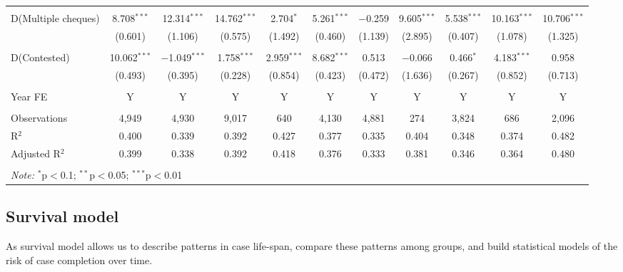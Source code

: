 \begin{landscape}
\begin{table}
{\begin{tabular}{lcccccccccc}
 & & & & & & & & & & \\ 
 D(Multiple cheques) & 8.708$^{***}$ & 12.314$^{***}$ & 14.762$^{***}$ & 2.704$^{*}$ & 5.261$^{***}$ & $-$0.259 & 9.605$^{***}$ & 5.538$^{***}$ & 10.163$^{***}$ & 10.706$^{***}$ \\ 
 & (0.601) & (1.106) & (0.575) & (1.492) & (0.460) & (1.139) & (2.895) & (0.407) & (1.078) & (1.325) \\ 
 & & & & & & & & & & \\ 
 D(Contested) & 10.062$^{***}$ & $-$1.049$^{***}$ & 1.758$^{***}$ & 2.959$^{***}$ & 8.682$^{***}$ & 0.513 & $-$0.066 & 0.466$^{*}$ & 4.183$^{***}$ & 0.958 \\ 
 & (0.493) & (0.395) & (0.228) & (0.854) & (0.423) & (0.472) & (1.636) & (0.267) & (0.852) & (0.713) \\ 
 \hline \\[-1.8ex]
 Year FE & Y & Y & Y & Y & Y & Y & Y & Y & Y & Y \\
 \hline \\[-1.8ex] 
 Observations & 4,949 & 4,930 & 9,017 & 640 & 4,130 & 4,881 & 274 & 3,824 & 686 & 2,096 \\ 
 R$^{2}$ & 0.400 & 0.339 & 0.392 & 0.427 & 0.377 & 0.335 & 0.404 & 0.348 & 0.374 & 0.482 \\ 
 Adjusted R$^{2}$ & 0.399 & 0.338 & 0.392 & 0.418 & 0.376 & 0.333 & 0.381 & 0.346 & 0.364 & 0.480 \\ 
 \hline \\[-1.8ex] 
 \multicolumn{11}{l}{\textit{Note:} $^{*}$p$<$0.1; $^{**}$p$<$0.05; $^{***}$p$<$0.01} \\ 
 \end{tabular} }
 \end{table}
\end{landscape}

\subsection{Survival model}

As survival model allows us to describe patterns in case life-span, compare these patterns among groups, and build statistical models of the risk of case completion over time.

